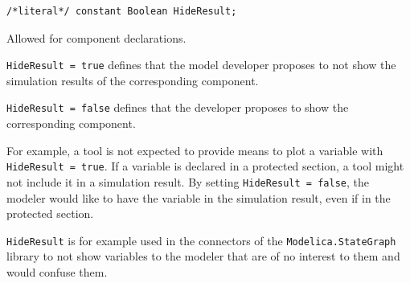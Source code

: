\begin{annotationdefinition}[HideResult]
\begin{synopsis}\begin{lstlisting}
/*literal*/ constant Boolean HideResult;
\end{lstlisting}\end{synopsis}
\begin{semantics}
Allowed for component declarations.

\lstinline!HideResult = true! defines that the model developer proposes to not show the simulation results of the corresponding component.

\lstinline!HideResult = false! defines that the developer proposes to show the corresponding component.

\begin{nonnormative}
For example, a tool is not expected to provide means to plot a variable with \lstinline!HideResult = true!.
If a variable is declared in a protected section, a tool might not include it in a simulation result.
By setting \lstinline!HideResult = false!, the modeler would like to have the variable in the simulation result, even if in the protected section.

\lstinline!HideResult! is for example used in the connectors of the \lstinline!Modelica.StateGraph! library to not show variables to the modeler that are of no interest to them and would confuse them.
\end{nonnormative}
\end{semantics}
\end{annotationdefinition}

